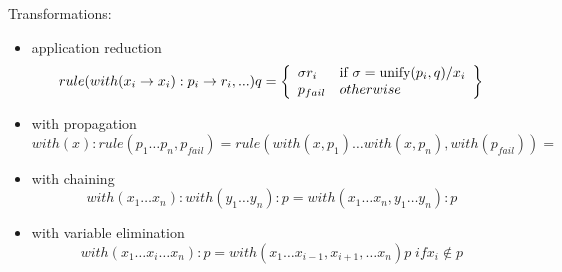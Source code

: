 \documentclass[12pt]{article}
\begin{document}
  Transformations:

\begin{itemize}
     \item application reduction
           $$ rule(with(x_i\to x_i):p_i \to r_i, ... ) q = 
                    \left\{\begin{array}{l l}
                             \sigma r_i & \text{if $\sigma=\text{unify}(p_i,q)/x_{i}$} \\
                             p_{fail}   & otherwise \\
                           \end{array}
                    \right\} 
           $$
     \item with propagation
           $$ with(x):rule(p_1 \dots p_{n}, p_{fail}) =
               rule(with(x,p_1) \dots with(x,p_{n}), with(p_{fail})) =
           $$
     \item with chaining
           $$ with(x_1 \dots x_n):with(y_1 \dots y_n):p =
                with(x_1 \dots x_n, y_1 \dots y_n):p $$
     \item with variable elimination
           $$ with(x_{1} \dots x_{i} \dots x_{n}):p = 
              with(x_{1} \dots x_{i-1}, x_{i+1}, \dots x_{n})p \; if x_i \not\in p $$  
\end{itemize}






\end{document}
